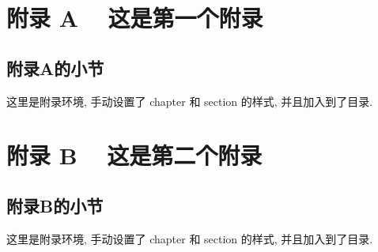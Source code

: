 \documentclass[master,print]{shnuthesis}
\begin{document}

%
%
%
%
%
%





\appendix

\chapter{附录 A ~ 这是第一个附录}
\renewcommand{\thesection}{A.\arabic{section}}
\section{附录A的小节}

这里是附录环境, 手动设置了 chapter 和 section 的样式, 并且加入到了目录.



\chapter{附录 B ~ 这是第二个附录}
\renewcommand{\thesection}{B.\arabic{section}}
\section{附录B的小节}

这里是附录环境, 手动设置了 chapter 和 section 的样式, 并且加入到了目录.
\end{document}
